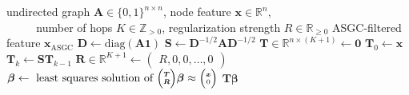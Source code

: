 \documentclass{article}
\begin{document}
\begin{algorithm}
  \caption{Adaptive Simple Graph Convolution (ASGC) Filter}
  \label{alg:asgc}
\begin{algorithmic}
   undirected graph $\bm{A} \in \{0,1\}^{n \times n}$, node feature $\bm{x} \in \mathbb{R}^{n}$, \\$\hspace{28pt}$ number of hops $K \in \mathbb{Z}_{>0}$, regularization strength $R \in \mathbb{R}_{\geq 0}$
   ASGC-filtered feature $\bm{x}_\text{ASGC}$
  \STATE $\bm{D} \gets \text{diag}\left( \bm{A}\bm{1} \right)$ 
  \STATE $\bm{S} \gets \bm{D}^{-1/2} \bm{A} \bm{D}^{-1/2}$ 
  \STATE $\bm{T} \in \mathbb{R}^{n \times (K+1)} \gets \bm{0}$ 
  \STATE $\bm{T}_0 \gets \bm{x}$
  \STATE $\bm{T}_k \gets \bm{S} \bm{T}_{k-1}$
  \ENDFOR
  \STATE $\bm{R} \in \mathbb{R}^{K+1} \gets \begin{pmatrix} R, 0, 0, \dots, 0 \end{pmatrix}$
  \STATE $\bm{\beta} \gets \text{ least squares solution of } {\tiny \begin{pmatrix} \bm{T} \\ \bm{R} \end{pmatrix}} \bm{\beta} \approx {\tiny \begin{pmatrix} \bm{x} \\ 0 \end{pmatrix}} $
   $\bm{T} \bm{\beta}$
\end{algorithmic}
\end{algorithm}
\end{document}
